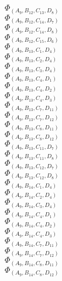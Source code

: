\documentclass[14pt]{article}
\begin{document}
    $\Phi_{({A}_{9}, {B}_{12}, {C}_{13}, {D}_{8})}$ \\ 
    $\Phi_{({A}_{9}, {B}_{12}, {C}_{14}, {D}_{7})}$ \\ 
    $\Phi_{({A}_{9}, {B}_{12}, {C}_{14}, {D}_{8})}$ \\ 
    $\Phi_{({A}_{9}, {B}_{12}, {C}_{15}, {D}_{6})}$ \\ 
    $\Phi_{({A}_{9}, {B}_{13}, {C}_{1}, {D}_{4})}$ \\ 
    $\Phi_{({A}_{9}, {B}_{13}, {C}_{2}, {D}_{4})}$ \\ 
    $\Phi_{({A}_{9}, {B}_{13}, {C}_{3}, {D}_{4})}$ \\ 
    $\Phi_{({A}_{9}, {B}_{13}, {C}_{4}, {D}_{1})}$ \\ 
    $\Phi_{({A}_{9}, {B}_{13}, {C}_{4}, {D}_{2})}$ \\ 
    $\Phi_{({A}_{9}, {B}_{13}, {C}_{4}, {D}_{3})}$ \\ 
    $\Phi_{({A}_{9}, {B}_{13}, {C}_{7}, {D}_{11})}$ \\ 
    $\Phi_{({A}_{9}, {B}_{13}, {C}_{7}, {D}_{12})}$ \\ 
    $\Phi_{({A}_{9}, {B}_{13}, {C}_{8}, {D}_{11})}$ \\ 
    $\Phi_{({A}_{9}, {B}_{13}, {C}_{8}, {D}_{12})}$ \\ 
    $\Phi_{({A}_{9}, {B}_{13}, {C}_{11}, {D}_{7})}$ \\ 
    $\Phi_{({A}_{9}, {B}_{13}, {C}_{11}, {D}_{8})}$ \\ 
    $\Phi_{({A}_{9}, {B}_{13}, {C}_{12}, {D}_{7})}$ \\ 
    $\Phi_{({A}_{9}, {B}_{13}, {C}_{12}, {D}_{8})}$ \\ 
    $\Phi_{({A}_{9}, {B}_{14}, {C}_{1}, {D}_{4})}$ \\ 
    $\Phi_{({A}_{9}, {B}_{14}, {C}_{2}, {D}_{4})}$ \\ 
    $\Phi_{({A}_{9}, {B}_{14}, {C}_{3}, {D}_{4})}$ \\ 
    $\Phi_{({A}_{9}, {B}_{14}, {C}_{4}, {D}_{1})}$ \\ 
    $\Phi_{({A}_{9}, {B}_{14}, {C}_{4}, {D}_{2})}$ \\ 
    $\Phi_{({A}_{9}, {B}_{14}, {C}_{4}, {D}_{3})}$ \\ 
    $\Phi_{({A}_{9}, {B}_{14}, {C}_{7}, {D}_{11})}$ \\ 
    $\Phi_{({A}_{9}, {B}_{14}, {C}_{7}, {D}_{12})}$ \\ 
    $\Phi_{({A}_{9}, {B}_{14}, {C}_{8}, {D}_{11})}$ \\ 
    $\Phi_{({A}_{9}, {B}_{14}, {C}_{8}, {D}_{12})}$ \\ 
\end{document}
